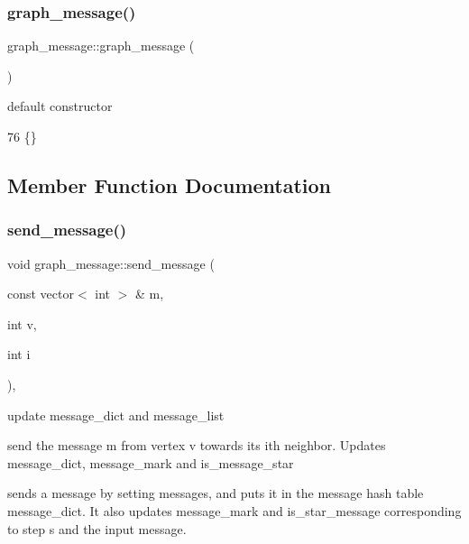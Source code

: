 \subsubsection{\texorpdfstring{graph\+\_\+message()}{graph\_message()}\hspace{0.1cm}{\footnotesize\ttfamily [2/2]}}
{\footnotesize\ttfamily graph\+\_\+message\+::graph\+\_\+message (\begin{DoxyParamCaption}{ }\end{DoxyParamCaption})\hspace{0.3cm}{\ttfamily [inline]}}



default constructor 


\begin{DoxyCode}
76 \{\}
\end{DoxyCode}


\subsection{Member Function Documentation}
\mbox{\label{classgraph__message_aa76d1d5420a12477fa1dddd878d78c8f}} 
\subsubsection{\texorpdfstring{send\+\_\+message()}{send\_message()}}
{\footnotesize\ttfamily void graph\+\_\+message\+::send\+\_\+message (\begin{DoxyParamCaption}\item[{const vector$<$ int $>$ \&}]{m,  }\item[{int}]{v,  }\item[{int}]{i }\end{DoxyParamCaption})\hspace{0.3cm}{\ttfamily [inline]}, {\ttfamily [private]}}



update message\+\_\+dict and message\+\_\+list 

send the message m from vertex v towards its ith neighbor. Updates message\+\_\+dict, message\+\_\+mark and is\+\_\+message\+\_\+star

sends a message by setting messages, and puts it in the message hash table message\+\_\+dict. It also updates message\+\_\+mark and is\+\_\+star\+\_\+message corresponding to step s and the input message.


